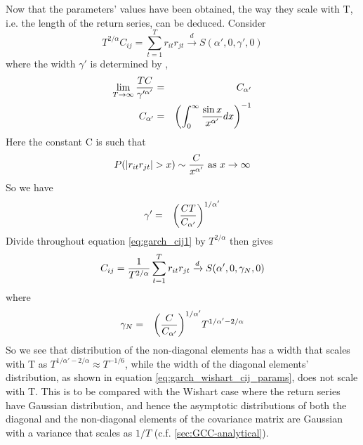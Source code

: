 \documentclass{report}
\begin{document}
Now that the parameters' values have been obtained, the way they scale
with T, i.e. the length of the return series, can be deduced. Consider
\begin{equation}\label{eq:garch_cij1}
  T^{2/\alpha} C_{ij} = \sum_{t=1}^T r_{it} r_{jt} \xrightarrow{d} S(\alpha',
  0, \gamma', 0)
\end{equation}
where the width $\gamma'$ is determined by \cite{Bilik2008},
\begin{eqnarray*}
  \lim_{T\to\infty} {T C \over \gamma'^{\alpha'}}
  &=& C_{\alpha'} \\
  C_{\alpha'} &=& \left( \int_0^\infty {\sin x \over x^{\alpha'}} dx
  \right)^{-1} \\
\end{eqnarray*}
Here the constant C is such that
\begin{equation*}
  P(|r_{it}r_{jt}| > x) \sim {C \over x^{\alpha'}} \text{ as $x \to \infty$}
\end{equation*}
So we have
\begin{eqnarray*}
  \gamma' &=& {\left( CT \over C_{\alpha'}\right)^{1/\alpha'}}
\end{eqnarray*}
Divide throughout equation \ref{eq:garch_cij1} by $T^{2/\alpha}$ then
gives
\begin{equation}\label{eq:garch_cij2}
  C_{ij} = {1 \over T^{2/\alpha}}\sum_{t=1}^T r_{it} r_{jt}
  \xrightarrow{d}
  S(\alpha', 0, \gamma_N, 0)
\end{equation}
where
\begin{eqnarray*}
  \gamma_N &=& {\left(C \over C_{\alpha'}\right)^{1/\alpha'}}
  T^{1/\alpha'-2/\alpha} \\
\end{eqnarray*}
So we see that distribution of the non-diagonal elements has a width
that scales with T as $T^{1/\alpha' - 2/\alpha} \approx T^{-1/6}$,
while the width of the diagonal elements' distribution, as shown in
equation \ref{eq:garch_wishart_cij_params}, does not scale with
T. This is to be compared with the Wishart case where the return
series have Gaussian distribution, and hence the asymptotic
distributions of both the diagonal and the non-diagonal elements of the
covariance matrix are Gaussian with a variance that scales as $1/T$
(c.f. \ref{sec:GCC-analytical}).

\end{document}
